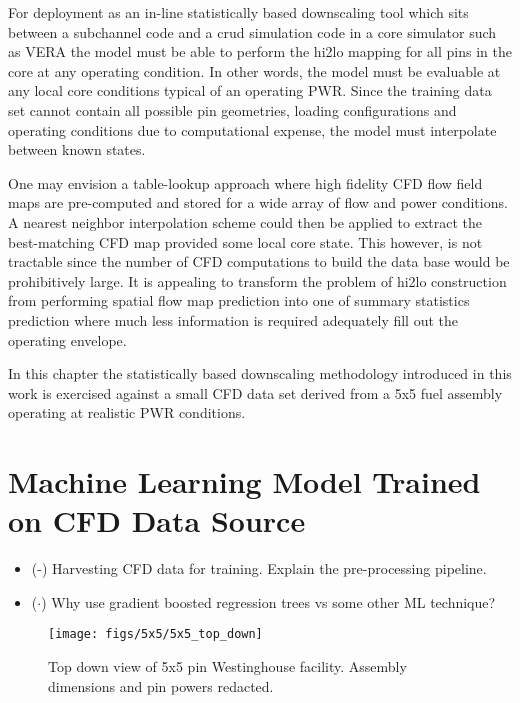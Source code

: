\label{sec:ml_cfd}

For deployment as an in-line statistically based downscaling tool which sits between a subchannel code and a crud simulation code in a core simulator such as VERA the model must be able to perform the hi2lo mapping for all pins in the core at any operating condition.  In other words, the model must be evaluable at any local core conditions typical of an operating PWR.  Since the training data set cannot contain all possible pin geometries, loading configurations and operating conditions due to computational expense, the model must interpolate between known states.  

One may envision a table-lookup approach where high fidelity CFD flow field maps are pre-computed and stored for a wide array of flow and power conditions.  A nearest neighbor interpolation scheme could then be applied to extract the best-matching CFD map provided some local core state.  This however, is not tractable since the number of CFD computations to build the data base would be prohibitively large.  It is appealing to transform the problem of hi2lo construction from performing spatial flow map prediction into one of summary statistics prediction where much less information is required adequately fill out the operating envelope.  

In this chapter the statistically based downscaling methodology introduced in this work is exercised against a small CFD data set derived from a 5x5 fuel assembly operating at realistic PWR conditions.


\section{Machine Learning Model Trained on CFD Data Source}


\begin{itemize}
	\item (\checkmark-) Harvesting CFD data for training. Explain the pre-processing pipeline.
	\item ($\cdot$) Why use gradient boosted regression trees vs some other ML technique?
\end{itemize}

\begin{figure}[H]
    \centering
    \texttt{[image: figs/5x5/5x5\_top\_down]}
    \caption[Top down view of 5x5 pin Westinghouse facility.]{Top down view of 5x5 pin Westinghouse facility.  Assembly dimensions and pin powers redacted.}
    \label{fig:5x5topdown}
\end{figure}

